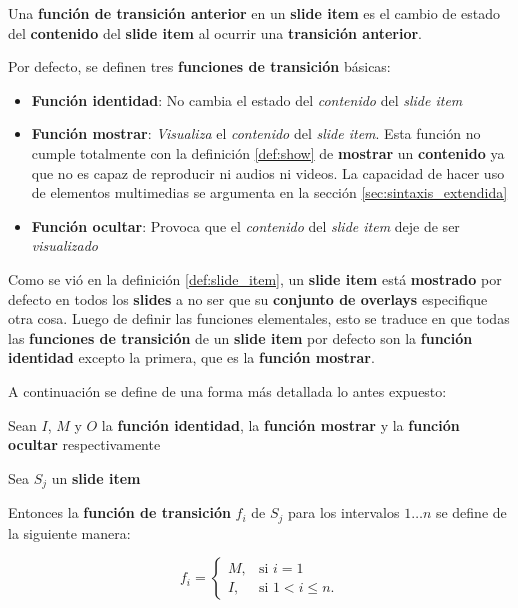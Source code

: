 		\begin{definition}
		\label{def:prev_transition_func}
			Una \textbf{función de transición anterior} en un \textbf{slide item} es el cambio de estado del \textbf{contenido} del \textbf{slide item} al ocurrir una \textbf{transición anterior}.
		\end{definition}

		Por defecto, se definen tres \textbf{funciones de transición} básicas:
		\begin{itemize}
		\label{it:basic_functions}
			\item \textbf{Función identidad}: No cambia el estado del \textit{contenido} del \textit{slide item}
			\item \textbf{Función mostrar}: \textit{Visualiza} el \textit{contenido} del \textit{slide item}. Esta función no cumple totalmente con la definición \ref{def:show} de \textbf{mostrar} un \textbf{contenido} ya que no es capaz de reproducir ni audios ni videos. La capacidad de hacer uso de elementos multimedias se argumenta en la sección \ref{sec:sintaxis_extendida} 
			\item \textbf{Función ocultar}: Provoca que el \textit{contenido} del \textit{slide item} deje de ser \textit{visualizado}
		\end{itemize}

		Como se vió en la definición \ref{def:slide_item}, un \textbf{slide item} está \textbf{mostrado} por defecto en todos los \textbf{slides} a no ser que su \textbf{conjunto de overlays} especifique otra cosa. Luego de definir las funciones elementales, esto se traduce en que todas las \textbf{funciones de transición} de un \textbf{slide item} por defecto son la \textbf{función identidad} excepto la primera, que es la \textbf{función mostrar}. 

		A continuación se define de una forma más detallada lo antes expuesto:

 		Sean \( I \), \( M \) y \( O \) la \textbf{función identidad}, la \textbf{función mostrar} y la \textbf{función ocultar} respectivamente


        Sea \( S_j \) un \textbf{slide item}

        Entonces la \textbf{función de transición} \( f_i \) de \( S_j \) para los intervalos \( 1 \dots n \) se define de la siguiente manera:


		\begin{equation}
		\label{eq:default}
			f_i = 
			\begin{cases}
				M, & \mbox{si }i = 1 \\
				I, & \mbox{si }1 < i \leq n.
			\end{cases}
		\end{equation}

